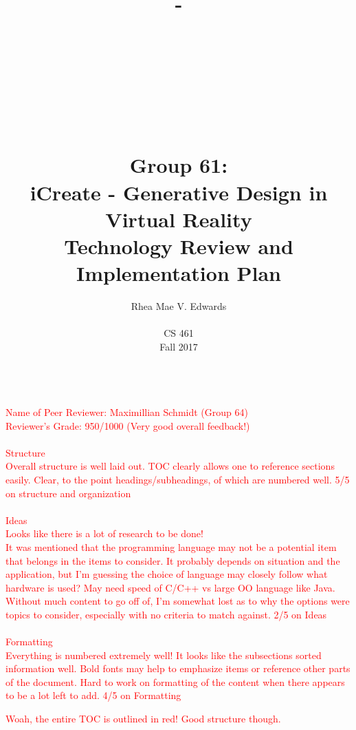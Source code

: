 \documentclass[letterpaper,10pt,onecolumn,compsoc]{IEEEtran}
\title{-\\ ~ \\ ~ \\ ~ \\ ~ \\ ~ \\Group 61:\\iCreate - Generative Design in Virtual Reality\\ Technology Review and Implementation Plan}
\author{Rhea Mae V. Edwards\\ ~ \\CS 461\\Fall 2017}
\begin{document}
\maketitle

\begin{abstract}



\end{abstract}

\textcolor{red}{
\\Name of Peer Reviewer: Maximillian Schmidt (Group 64)\\
Reviewer's Grade: 950/1000 (Very good overall feedback!)
\\ ~ \\
Structure \\
Overall structure is well laid out.  TOC clearly allows one to 
reference sections easily.  Clear, to the point headings/subheadings, of which are numbered well.  5/5 on structure and organization 
\\ ~ \\
Ideas \\
Looks like there is a lot of research to be done! \\
It was mentioned that the programming language may not be a potential item that belongs in the items to consider.  It probably depends on situation and the application, but I'm guessing the choice of language may closely follow what hardware is used?  May need speed of C/C++ vs large OO language like Java.  Without much content to go off of, I'm somewhat lost as to why the options were topics to consider, especially with no criteria to match against.  2/5 on Ideas
\\ ~ \\
Formatting \\
Everything is numbered extremely well!  It looks like the subsections sorted information well.  Bold fonts may help to emphasize items or reference other parts of the document.  Hard to work on formatting of the content when there appears to be a lot left to add. 4/5 on Formatting
}

\newpage


\tableofcontents
\textcolor{red}{Woah, the entire TOC is outlined in red!  Good structure though.
}
\end{document}
